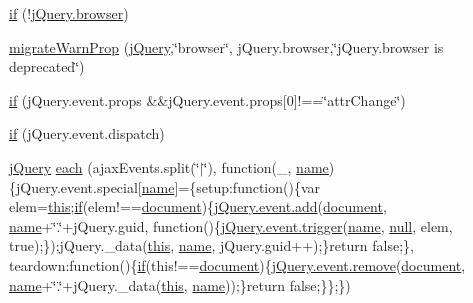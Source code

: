\begin{DoxyCompactItemize}
\item 
\hyperlink{jquery-1_8x_8js_adbd695a57e19ac14f318c59a4e4d854e}{if} (!\hyperlink{jquery-1_8x_8min_8js_acc1ba4586242adc2e962ab3f4b55f78b}{j\+Query.\+browser})
\item 
\hyperlink{jquery-1_8x_8js_aa8be8cdf1878fd7ec123aa2774ec5289}{migrate\+Warn\+Prop} (\hyperlink{xe__solid__enterprise__login_2js_2login_8js_a5d40f04b6bb824963a42ec4b5fbfe262}{j\+Query},\char`\"{}browser\char`\"{}, j\+Query.\+browser,\char`\"{}j\+Query.\+browser is deprecated\char`\"{})
\item 
\hyperlink{jquery-1_8x_8js_a25a937d80a493a68efb2488a512562e6}{if} (j\+Query.\+event.\+props \&\&j\+Query.\+event.\+props\mbox{[}0\mbox{]}!==\char`\"{}attr\+Change\char`\"{})
\item 
\hyperlink{jquery-1_8x_8js_a8da8f2b344a6ebbeb41a061532284553}{if} (j\+Query.\+event.\+dispatch)
\item 
\hyperlink{xe__solid__enterprise__login_2js_2login_8js_a5d40f04b6bb824963a42ec4b5fbfe262}{j\+Query} \hyperlink{jquery-1_8x_8js_a36d6d8263b0ffea1ba23f5a71cad7520}{each} (ajax\+Events.\+split(\char`\"{}$\vert$\char`\"{}), function(\+\_\+, \hyperlink{common_8js_a22c29d2aa8ed6161ce8faa718ef76e68}{name})\{j\+Query.\+event.\+special\mbox{[}\hyperlink{common_8js_a22c29d2aa8ed6161ce8faa718ef76e68}{name}\mbox{]}=\{setup\+:function()\{var elem=\hyperlink{jquery_8parallax-scroll_8min_8js_a05c09a5e9d53fa7adf0a7936038c2fa3}{this};\hyperlink{menu_2tpl_2js_2jquery_8jstree_8js_acba95bef569cfaee32c4ed0212b2bb92}{if}(elem!==\hyperlink{classdocument}{document})\{\hyperlink{jquery_8js_a638fd10c6d2f5e258459b1abfa3b94ea}{j\+Query.\+event.\+add}(\hyperlink{classdocument}{document}, \hyperlink{common_8js_a22c29d2aa8ed6161ce8faa718ef76e68}{name}+\char`\"{}.\char`\"{}+j\+Query.\+guid, function()\{\hyperlink{jquery_8js_a3a2670632785d79909fadd16431e30f9}{j\+Query.\+event.\+trigger}(\hyperlink{common_8js_a22c29d2aa8ed6161ce8faa718ef76e68}{name}, \hyperlink{modernizr_8min_8js_a286f9ec831c5e676eeb493248eab9575}{null}, elem, true);\});j\+Query.\+\_\+data(\hyperlink{jquery_8parallax-scroll_8min_8js_a05c09a5e9d53fa7adf0a7936038c2fa3}{this}, \hyperlink{common_8js_a22c29d2aa8ed6161ce8faa718ef76e68}{name}, j\+Query.\+guid++);\}return false;\}, teardown\+:function()\{\hyperlink{menu_2tpl_2js_2jquery_8jstree_8js_acba95bef569cfaee32c4ed0212b2bb92}{if}(this!==\hyperlink{classdocument}{document})\{\hyperlink{jquery_8js_ac2bfeac9f445211e9176a527d3a292c4}{j\+Query.\+event.\+remove}(\hyperlink{classdocument}{document}, \hyperlink{common_8js_a22c29d2aa8ed6161ce8faa718ef76e68}{name}+\char`\"{}.\char`\"{}+j\+Query.\+\_\+data(\hyperlink{jquery_8parallax-scroll_8min_8js_a05c09a5e9d53fa7adf0a7936038c2fa3}{this}, \hyperlink{common_8js_a22c29d2aa8ed6161ce8faa718ef76e68}{name}));\}return false;\}\};\})
\end{DoxyCompactItemize}

